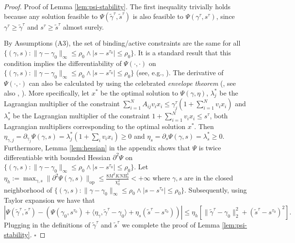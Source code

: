 \documentclass[opre]{informs3aa}
\renewcommand{\tilde}{\widetilde}
\renewcommand{\tilde}{\widetilde}
\begin{document}
\begin{proof}{Proof of Lemma \ref{lem:psi-stability}.}
The first inequality trivially holds because any solution feasible to $\Psi(\tilde\gamma^\tau,\tilde s^\tau)$ is also feasible to $\Psi(\gamma^\tau,s^\tau)$,
since $\gamma^\tau\geq \tilde\gamma^\tau$ and $s^\tau\geq\tilde s^\tau$ almost surely.

By Assumptions (A3), the set of binding/active constraints are the same for all $\{(\gamma,s): \|\gamma-\gamma_0\|_{\infty}\leq\rho_0\wedge |s-s^{\tau_0}|\leq\rho_0\}$.
It is a standard result that this condition implies the differentiability of $\Psi(\cdot,\cdot)$ on $\{(\gamma,s): \|\gamma-\gamma_0\|_{\infty}\leq\rho_0\wedge |s-s^{\tau_0}|\leq\rho_0\}$ (see, e.g., \cite{gal2012advances,tercca2020envelope}).
The derivative of $\Psi(\cdot,\cdot)$ can also be calculated by using the celebrated \emph{envelope theorem} (\cite{milgrom2002envelope}, see also 
\cite[Theorem 1.F.1]{takayama1985mathematical}, \citep[Theorem 1]{tercca2020envelope}).
More specifically, let $x^*$ be the optimal solution to $\Psi(\gamma,\eta)$, $\lambda_j^*$ be the Lagrangian multiplier of the constraint $\sum_{i=1}^N A_{ij}v_ix_i \leq \gamma^\tau_j(1+\sum_{i=1}^N v_ix_i)$
and $\lambda_s^*$ be the Lagrangian multiplier of the constraint $1+\sum_{i=1}^N v_ix_i\leq s^\tau$, {both Lagrangian multipliers corresponding to the optimal solution $x^*$.} Then
$\eta_{\gamma,j} = {\partial_{\gamma_j}}\Psi(\gamma,s) = \lambda_j^*(1+\sum_iv_ix_i) \geq 0$ and 
$\eta_{s} = {\partial_s}\Psi(\gamma,s) = \lambda_s^* \geq 0$.
{Furthermore, Lemma \ref{lem:hessian} in the appendix shows that $\Psi$ is twice differentiable with bounded Hessian $\partial^2\Psi$ on $\{(\gamma,s): \|\gamma-\gamma_0\|_{\infty}\leq\rho_0\wedge |s-s^{\tau_0}|\leq\rho_0\}$.}
Let $\eta_h:=\max_{\gamma,s}\|\partial^2\Psi(\gamma,s)\|_{\mathrm{op}}\leq \frac{8 M^2 KN B_0^3}{\chi_0^2}<+\infty$ where $\gamma,s$ are in the closed neighborhood of $\{(\gamma,s): \|\gamma-\gamma_0\|_{\infty}\leq\rho_0\wedge |s-s^{\tau_0}|\leq\rho_0\}$.
Subsequently, using Taylor expansion we have that
$
|\Psi(\tilde\gamma^\tau,\tilde s^\tau) - (\Psi(\gamma_0,s^{\tau_0}) + \langle \eta_\gamma,\tilde\gamma^\tau-\gamma_0\rangle + \eta_s(\tilde s^\tau-s^{\tau_0}))|
\leq \eta_h [\|\tilde\gamma^\tau-\gamma_0\|_2^2+(\tilde s^\tau-s^{\tau_0})^2].
$
Plugging in the definitions of $\tilde\gamma^\tau$ and $\tilde s^\tau$ we complete the proof of Lemma \ref{lem:psi-stability}. $\square$
\end{proof}
\end{document}
